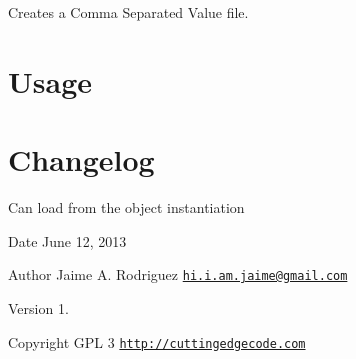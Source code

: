 Creates a Comma Separated Value file.\hypertarget{template1_usage}{}\section{Usage}\label{template1_usage}

\hypertarget{template1_changelog}{}\section{Changelog}\label{template1_changelog}

\begin{DoxyItemize}
\item Can load from the object instantiation
\end{DoxyItemize}

\begin{DoxyDate}{Date}
June 12, 2013 
\end{DoxyDate}
\begin{DoxyAuthor}{Author}
Jaime A. Rodriguez \href{mailto:hi.i.am.jaime@gmail.com}{\tt hi.\-i.\-am.\-jaime@gmail.\-com} 
\end{DoxyAuthor}
\begin{DoxyVersion}{Version}
1. 
\end{DoxyVersion}
\begin{DoxyCopyright}{Copyright}
G\-P\-L 3 \href{http://cuttingedgecode.com}{\tt http\-://cuttingedgecode.\-com} 
\end{DoxyCopyright}
